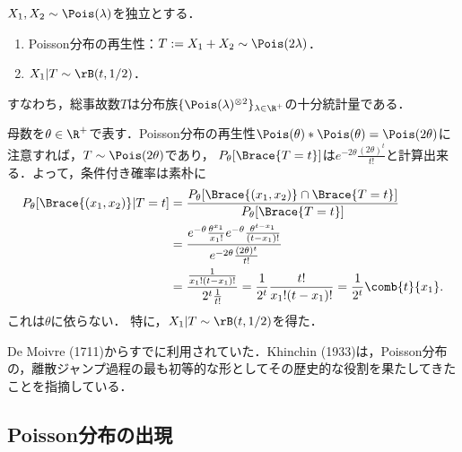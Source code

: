 \documentclass[uplatex,dvipdfmx]{jsreport}
\begin{document}
\begin{history}
    $X_1,X_2\sim\Pois(\lambda)$を独立とする．
    \begin{enumerate}
        \item Poisson分布の再生性：$T:=X_1+X_2\sim\Pois(2\lambda)$．
        \item $X_1|T\sim\rB(t,1/2)$．
    \end{enumerate}
    すなわち，総事故数$T$は分布族$\{\Pois(\lambda)^{\otimes 2}\}_{\lambda\in\R^+}$の十分統計量である．
\end{history}
\begin{Proof}
    母数を$\theta\in\R^+$で表す．Poisson分布の再生性$\Pois(\theta)*\Pois(\theta)=\Pois(2\theta)$に注意すれば，$T\sim\Pois(2\theta)$であり，
    $P_\theta[\Brace{T=t}]$は$e^{-2\theta}\frac{(2\theta)^t}{t!}$と計算出来る．よって，条件付き確率は素朴に
    \begin{align*}
        P_\theta[\Brace{(x_1,x_2)}|T=t]&=\frac{P_\theta[\Brace{(x_1,x_2)}\cap\Brace{T=t}]}{P_\theta[\Brace{T=t}]}\\
        &=\frac{e^{-\theta}\frac{\theta^{x_1}}{x_1!}e^{-\theta}\frac{\theta^{t-x_1}}{(t-x_1)!}}{e^{-2\theta}\frac{(2\theta)^t}{t!}}\\
        &=\frac{\frac{1}{x_1!(t-x_1)!}}{2^t\frac{1}{t!}}=\frac{1}{2^t}\frac{t!}{x_1!(t-x_1)!}=\frac{1}{2^t}\comb{t}{x_1}.
    \end{align*}
    これは$\theta$に依らない．
    特に，$X_1|T\sim\rB(t,1/2)$を得た．
\end{Proof}
\begin{history}
    De Moivre (1711)からすでに利用されていた．Khinchin (1933)は，Poisson分布の，離散ジャンプ過程の最も初等的な形としてその歴史的な役割を果たしてきたことを指摘している．\cite{Last-Penrose-PoissonProcess}
\end{history}

\subsection{Poisson分布の出現}
\end{document}
